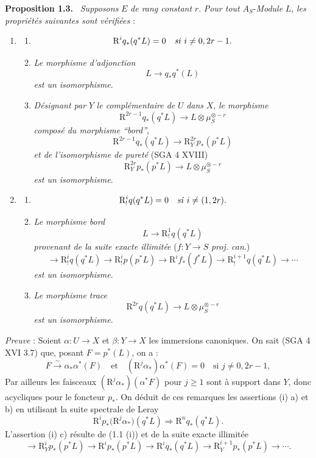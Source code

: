\documentclass[11pt]{article}
\newenvironment{statement}[1]{\par\medskip\noindent\textbf{#1.}\ }{\par\medskip}
\begin{document}
\begin{statement}{Proposition 1.3}
\emph{Supposons} $E$ \emph{de rang constant} $r$. \emph{Pour tout} $A_S$-\emph{Module} $L$, \emph{les propriétés suivantes sont vérifiées} :
\begin{enumerate}[label=(\roman*)]
\item
\begin{enumerate}[label=\alph*)]
\item
\[
\mathrm{R}^i q_*(q^*L)=0\quad\text{\emph{si} }i\ne 0,2r-1.
\]
\item \emph{Le morphisme d'adjonction}
\[
L\longrightarrow q_*q^*(L)
\]
\emph{est un isomorphisme}.
\item \emph{Désignant par} $Y$ \emph{le complémentaire de} $U$
\emph{dans} $X$, \emph{le morphisme}
\[
\mathrm{R}^{2r-1}q_*(q^*L)\longrightarrow L\otimes\mu_S^{\otimes -r}
\]
\emph{composé du morphisme ``bord''},
\[
\mathrm{R}^{2r-1}q_*(q^*L)\longrightarrow \mathrm{R}_Y^{2r}p_*(p^*L)
\tag{1}
\]
\emph{et de l'isomorphisme de pureté} (SGA 4 XVIII)
\[
\mathrm{R}_Y^{2r}p_*(p^*L)\longrightarrow L\otimes\mu_S^{\otimes -r}
\]
\emph{est un isomorphisme}.
\end{enumerate}
\item
\begin{enumerate}[label=\alph*)]
\item
\[
\mathrm{R}_!^i q(q^*L)=0\quad\text{\emph{si} }i\ne (1,2r).
\]
\item \emph{Le morphisme bord}
\[
L\longrightarrow \mathrm{R}_!^1 q(q^*L)
\]
\emph{provenant de la suite exacte illimitée} ($f:Y\to S$ \emph{proj. can}.)
\[
\longrightarrow \mathrm{R}_!^i q(q^*L)\longrightarrow \mathrm{R}_!^i p(p^*L)
\longrightarrow \mathrm{R}^i f_*(f^*L)\longrightarrow \mathrm{R}_!^{i+1}q(q^*L)\longrightarrow\cdots
\]
\emph{est un isomorphisme}.
\item \emph{Le morphisme trace}
\[
\mathrm{R}^{2r}q(q^*L)\longrightarrow L\otimes\mu_S^{\otimes -r}
\]
\emph{est un isomorphisme}.
\end{enumerate}
\end{enumerate}
\end{statement}

\emph{Preuve} : Soient $\alpha:U\to X$ et $\beta:Y\to X$ les immersions canoniques. On sait (SGA 4 XVI 3.7) que, posant $F=p^*(L)$, on a :
\[
F\xrightarrow{\sim}\alpha_*\alpha^*(F)
\quad\text{et}\quad
(\mathrm{R}^j\alpha_*)\alpha^*(F)=0\quad\text{si }j\ne0,2r-1,
\]
Par ailleurs les faisceaux $(\mathrm{R}^j\alpha_*)(\alpha^*F)$ pour $j\ge1$ sont à support dans $Y$, donc acycliques pour le foncteur $p_*$. On déduit de ces remarques les assertions (i) a) et b) en utilisant la suite spectrale de Leray
\[
\mathrm{R}^i p_*\bigl(\mathrm{R}^j\alpha_*\bigr)(q^*L)\Longrightarrow \mathrm{R}^n q_*(q^*L).
\]
L'assertion (i) c) résulte de (1.1 (i)) et de la suite exacte illimitée
\[
\longrightarrow \mathrm{R}_Y^i p_*(p^*L)\longrightarrow \mathrm{R}^i p_*(p^*L)\longrightarrow \mathrm{R}^i q_*(q^*L)
\longrightarrow \mathrm{R}_Y^{i+1}p_*(p^*L)\longrightarrow\cdots.
\]
\end{document}
